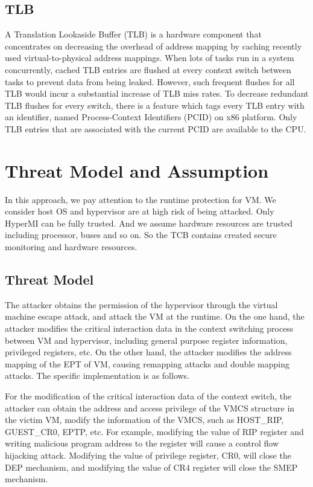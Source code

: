 \documentclass[conference]{IEEEtran}
\begin{document}
\subsection{TLB}
A Translation Lookaside Buffer (TLB) is a hardware component that concentrates on decreasing the overhead of address mapping by caching recently used virtual-to-physical address mappings. When lots of tasks run in a system concurrently, cached TLB entries are flushed at every context switch between tasks to prevent data from being leaked. However, such frequent flushes for all TLB would incur a substantial increase of TLB miss rates. To decrease redundant TLB flushes for every switch, there is a feature which tags every TLB entry with an identifier, named Process-Context Identifiers (PCID) on x86 platform. Only TLB entries that are associated with the current PCID are available to the CPU.

\section{Threat Model and Assumption}
In this approach, we pay attention to the runtime protection for VM. We consider host OS and hypervisor are at high risk of being attacked. Only HyperMI can be fully trusted. And we assume hardware resources are trusted including processor, buses and so on. So the TCB contains created secure monitoring and hardware resources.


\subsection{Threat Model}
The attacker obtains the permission of the hypervisor through the virtual machine escape attack, and attack the VM at the runtime. On the one hand, the attacker modifies the critical interaction data in the context switching process between VM and hypervisor, including general purpose register information, privileged registers, etc. On the other hand, the attacker modifies the address mapping of the EPT of VM, causing remapping attacks and double mapping attacks. The specific implementation is as follows.

For the modification of the critical interaction data of the context switch, the attacker can obtain the address and access privilege of the VMCS structure in the victim VM, modify the information of the VMCS, such as HOST\_RIP, GUEST\_CR0, EPTP, etc. For example, modifying the value of RIP register and writing malicious program address to the register will cause a control flow hijacking attack. Modifying the value of privilege register, CR0, will close the DEP mechanism, and modifying the value of CR4 register will close the SMEP mechanism.
\end{document}
